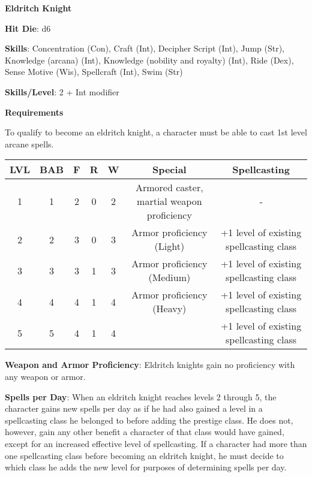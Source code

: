 \textbf{\huge{Eldritch Knight}}

\textbf{Hit Die}: d6

\textbf{Skills}: Concentration (Con), Craft (Int), Decipher Script (Int), Jump (Str), Knowledge (arcana) (Int), Knowledge (nobility and royalty) (Int), Ride (Dex), Sense Motive (Wis), Spellcraft (Int), Swim (Str)

\textbf{Skills/Level}: 2 + Int modifier

\textbf{\large{Requirements}}

To qualify to become an eldritch knight, a character must be able to cast 1st level arcane spells.

\begin{center}
\begin{adjustwidth}{-4cm}{}
\begin{small}
\begin{tabular}{| c | c | c | c | c | c | c |}
\hline
LVL &BAB &F &R &W &Special &Spellcasting \\
\hline
1 &1 &2 &0 &2 &Armored caster, martial weapon proficiency &- \\
2 &2 &3 &0 &3 &Armor proficiency (Light) &+1 level of existing spellcasting class \\
3 &3 &3 &1 &3 &Armor proficiency (Medium) &+1 level of existing spellcasting class \\
4 &4 &4 &1 &4 &Armor proficiency (Heavy) &+1 level of existing spellcasting class \\
5 &5 &4 &1 &4 & &+1 level of existing spellcasting class \\
\hline
\end{tabular}
\end{small}
\end{adjustwidth}
\end{center}

\textbf{Weapon and Armor Proficiency}: Eldritch knights gain no proficiency with any weapon or armor.

\textbf{Spells per Day}: When an eldritch knight reaches levels 2 through 5, the character gains new spells per day as if he had also gained a level in a spellcasting class he belonged to before adding the prestige class. He does not, however, gain any other benefit a character of that class would have gained, except for an increased effective level of spellcasting. If a character had more than one spellcasting class before becoming an eldritch knight, he must decide to which class he adds the new level for purposes of determining spells per day.

